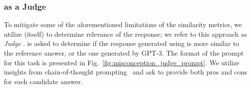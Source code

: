 \subsubsection{{\DV} as a Judge}
\label{subsubsec:dv3judge}


To mitigate some of the aforementioned limitations of the similarity metrics, we utilize {\DV} (itself) to determine relevance of the response; we refer to this approach as \textit{Judge \DV}. {\DV} is asked to determine if the response generated using {\DV} is more similar to the reference answer, or the one generated by GPT-3. The format of the prompt for this task is presented in Fig.~\ref{fig:misconception_judge_prompt}. We utilize insights from chain-of-thought prompting~\cite{wei2022chain} and ask {\DV} to provide both pros and cons for each candidate answer.

